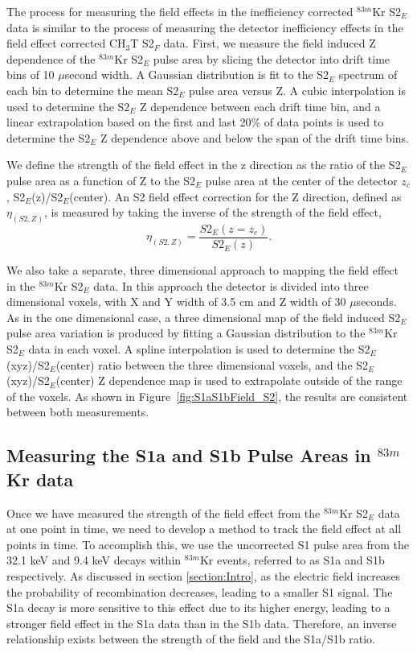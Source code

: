 \documentclass[a4paper,10pt,twocolumn]{article}
\begin{document}
The process for measuring the field effects in the inefficiency corrected $^{83m}$Kr S2$_E$ data is similar to the process of measuring the detector inefficiency effects in the field effect corrected CH$_3$T S2$_F$ data.  First, we measure the field induced Z dependence of the $^{83m}$Kr S2$_E$ pulse area by slicing the detector into drift time bins of 10 $\mu$second width.  A Gaussian distribution is fit to the S2$_E$ spectrum of each bin to determine the mean S2$_E$ pulse area versus Z.   A cubic interpolation is used to determine the S2$_E$ Z dependence between each drift time bin, and a linear extrapolation based on the first and last 20\% of data points is used to determine the S2$_E$ Z dependence above and below the span of the drift time bins.  

We define the strength of the field effect in the z direction as the ratio of the S2$_E$ pulse area as a function of Z to the S2$_E$ pulse area at the center of the detector $z_c$, S2$_E$(z)/S2$_E$(center).  An S2 field effect correction for the Z direction, defined as $\eta_{(S2,Z)}$, is measured by taking the inverse of the strength of the field effect, 
\begin{equation}
\eta_{(S2,Z)} = \frac{S2_E(z=z_c)}{S2_E(z)}.
\end{equation} 

We also take a separate, three dimensional approach to mapping the field effect in the $^{83m}$Kr S2$_E$ data. In this approach the detector is divided into three dimensional voxels, with X and Y width of 3.5 cm and Z width of 30 $\mu$seconds.  As in the one dimensional case, a three dimensional map of the field induced S2$_E$ pulse area variation is produced by fitting a Gaussian distribution to the $^{83m}$Kr S2$_E$ data in each voxel.  A spline interpolation is used to determine the S2$_E$(xyz)/S2$_E$(center) ratio between the three dimensional voxels, and the S2$_E$(xyz)/S2$_E$(center) Z dependence map is used to extrapolate outside of the range of the voxels.  As shown in Figure~\ref{fig:S1aS1bField_S2}, the results are consistent between both measurements.

\subsection{Measuring the S1a and S1b Pulse Areas in $^{83m}$Kr data} \label{section:S1aS1b1}

Once we have measured the strength of the field effect from the $^{83m}$Kr S2$_E$ data at one point in time, we need to develop a method to track the field effect at all points in time.  To accomplish this, we use the uncorrected S1 pulse area from the 32.1 keV and 9.4 keV decays within $^{83m}$Kr events, referred to as S1a and S1b respectively.  As discussed in section \ref{section:Intro}, as the electric field increases the probability of recombination decreases, leading to a smaller S1 signal.  The S1a decay is more sensitive to this effect due to its higher energy, leading to a stronger field effect in the S1a data than in the S1b data.   Therefore, an inverse relationship exists between the strength of the field and the S1a/S1b ratio.  
\end{document}

